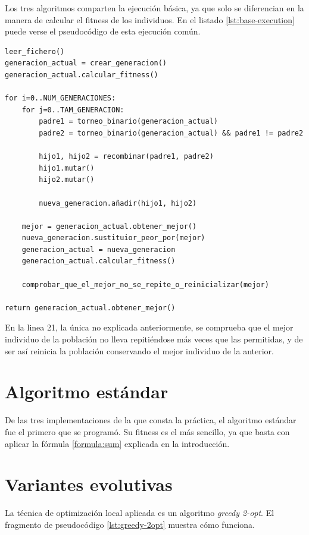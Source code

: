 Los tres algoritmos comparten la ejecución básica, ya que solo se diferencian en la manera de calcular el fitness de los individuos. En el listado \ref{lst:base-execution} puede verse el pseudocódigo de esta ejecución común.

\begin{lstlisting}[caption={Ejecución base de los algoritmos}, label={lst:base-execution}]
leer_fichero()
generacion_actual = crear_generacion()
generacion_actual.calcular_fitness()

for i=0..NUM_GENERACIONES:
    for j=0..TAM_GENERACION:
        padre1 = torneo_binario(generacion_actual)
        padre2 = torneo_binario(generacion_actual) && padre1 != padre2
        
        hijo1, hijo2 = recombinar(padre1, padre2)
        hijo1.mutar()
        hijo2.mutar()
        
        nueva_generacion.añadir(hijo1, hijo2)
        
    mejor = generacion_actual.obtener_mejor()
    nueva_generacion.sustituior_peor_por(mejor)
    generacion_actual = nueva_generacion
    generacion_actual.calcular_fitness()

    comprobar_que_el_mejor_no_se_repite_o_reinicializar(mejor)

return generacion_actual.obtener_mejor()
\end{lstlisting}

En la linea 21, la única no explicada anteriormente, se comprueba que el mejor individuo de la población no lleva repitiéndose más veces que las permitidas, y de ser así reinicia la población conservando el mejor individuo de la anterior.

\section{Algoritmo estándar}

De las tres implementaciones de la que consta la práctica, el algoritmo estándar fue el primero que se programó. Su fitness es el más sencillo, ya que basta con aplicar la fórmula \ref{formula:sum} explicada en la introducción.

\section{Variantes evolutivas}

La técnica de optimización local aplicada es un algoritmo \textit{greedy 2-opt}. El fragmento de pseudocódigo \ref{lst:greedy-2opt} muestra cómo funciona.

